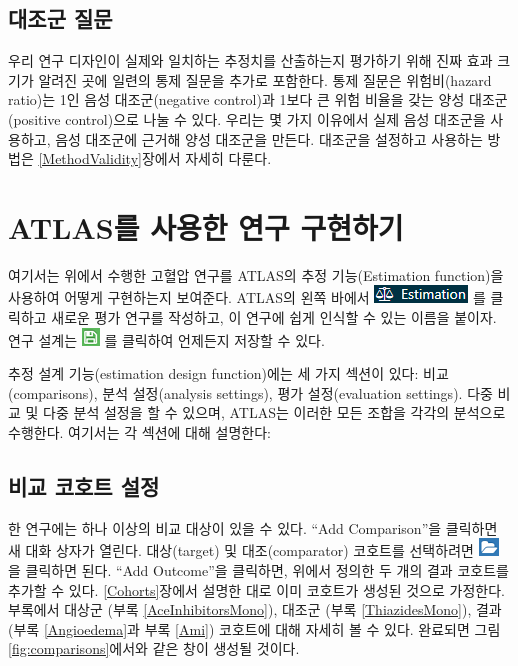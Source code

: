 \documentclass[11pt]{book}
\theoremstyle{definition}
\theoremstyle{definition}
\theoremstyle{definition}
\theoremstyle{remark}
\begin{document}
\subsection{대조군 질문}\label{-}

우리 연구 디자인이 실제와 일치하는 추정치를 산출하는지 평가하기 위해
진짜 효과 크기가 알려진 곳에 일련의 통제 질문을 추가로 포함한다. 통제
질문은 위험비(hazard ratio)는 1인 음성 대조군(negative control)과 1보다
큰 위험 비율을 갖는 양성 대조군(positive control)으로 나눌 수 있다.
우리는 몇 가지 이유에서 실제 음성 대조군을 사용하고, 음성 대조군에
근거해 양성 대조군을 만든다. 대조군을 설정하고 사용하는 방법은
\ref{MethodValidity}장에서 자세히 다룬다.

\section{ATLAS를 사용한 연구 구현하기}\label{PleAtlas}

여기서는 위에서 수행한 고혈압 연구를 ATLAS의 추정 기능(Estimation
function)을 사용하여 어떻게 구현하는지 보여준다. ATLAS의 왼쪽 바에서
\includegraphics{images/PopulationLevelEstimation/estimation.png} 를
클릭하고 새로운 평가 연구를 작성하고, 이 연구에 쉽게 인식할 수 있는
이름을 붙이자. 연구 설계는
\includegraphics{images/PopulationLevelEstimation/save.png} 를 클릭하여
언제든지 저장할 수 있다.

추정 설계 기능(estimation design function)에는 세 가지 섹션이 있다:
비교(comparisons), 분석 설정(analysis settings), 평가 설정(evaluation
settings). 다중 비교 및 다중 분석 설정을 할 수 있으며, ATLAS는 이러한
모든 조합을 각각의 분석으로 수행한다. 여기서는 각 섹션에 대해 설명한다:

\subsection{비교 코호트 설정}\label{ComparisonSettings}

한 연구에는 하나 이상의 비교 대상이 있을 수 있다. ``Add Comparison''을
클릭하면 새 대화 상자가 열린다. 대상(target) 및 대조(comparator)
코호트를 선택하려면
\includegraphics{images/PopulationLevelEstimation/open.png} 을 클릭하면
된다. ``Add Outcome''을 클릭하면, 위에서 정의한 두 개의 결과 코호트를
추가할 수 있다. \ref{Cohorts}장에서 설명한 대로 이미 코호트가 생성된
것으로 가정한다. 부록에서 대상군 (부록 \ref{AceInhibitorsMono}), 대조군
(부록 \ref{ThiazidesMono}), 결과 (부록 \ref{Angioedema}과 부록
\ref{Ami}) 코호트에 대해 자세히 볼 수 있다. 완료되면 그림
\ref{fig:comparisons}에서와 같은 창이 생성될 것이다.
\end{document}
